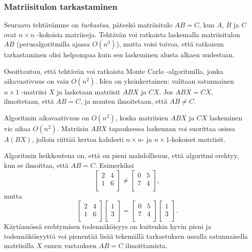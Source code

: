 \subsubsection{Matriisitulon tarkastaminen}


Seuraava tehtävämme on \emph{tarkastaa},
päteekö matriisitulo $AB=C$, kun $A$, $B$ ja $C$
ovat $n \times n$ -kokoisia matriiseja.
Tehtävän voi ratkaista laskemalla matriisitulon
$AB$ (perusalgoritmilla ajassa $O(n^3)$), mutta voisi toivoa,
että ratkaisun tarkastaminen olisi helpompaa
kuin sen laskeminen alusta alkaen uudestaan.

Osoittautuu, että tehtävän voi ratkaista
Monte Carlo -algoritmilla,
jonka aikavaativuus on vain $O(n^2)$.
Idea on yksinkertainen: valitaan satunnainen
$n \times 1$ -matriisi $X$ ja lasketaan
matriisit $ABX$ ja $CX$.
Jos $ABX=CX$, ilmoitetaan, että $AB=C$,
ja muuten ilmoitetaan, että $AB \neq C$.

Algoritmin aikavaativuus on $O(n^2)$,
koska matriisien $ABX$ ja $CX$ laskeminen
vie aikaa $O(n^2)$.
Matriisin $ABX$ tapauksessa laskennan
voi suorittaa osissa $A(BX)$, jolloin riittää
kertoa kahdesti $n \times n$- ja $n \times 1$-kokoiset
matriisit.

Algoritmin heikkoutena on, että on pieni mahdollisuus,
että algoritmi erehtyy, kun se ilmoittaa, että $AB=C$.
Esimerkiksi 
\[
 \begin{bmatrix}
  2 & 4 \\
  1 & 6 \\
 \end{bmatrix}
\neq
 \begin{bmatrix}
  0 & 5 \\
  7 & 4 \\
 \end{bmatrix},
\]
mutta
\[
 \begin{bmatrix}
  2 & 4 \\
  1 & 6 \\
 \end{bmatrix}
 \begin{bmatrix}
  1 \\
  3 \\
 \end{bmatrix}
=
 \begin{bmatrix}
  0 & 5 \\
  7 & 4 \\
 \end{bmatrix}
 \begin{bmatrix}
  1 \\
  3 \\
 \end{bmatrix}.
\]
Käytännössä erehtymisen todennäköisyys on kuitenkin hyvin
pieni ja todennäköisyyttä voi pienentää lisää
tekemällä tarkastuksen usealla
satunnaisella matriisilla $X$ ennen vastauksen
$AB=C$ ilmoittamista.

